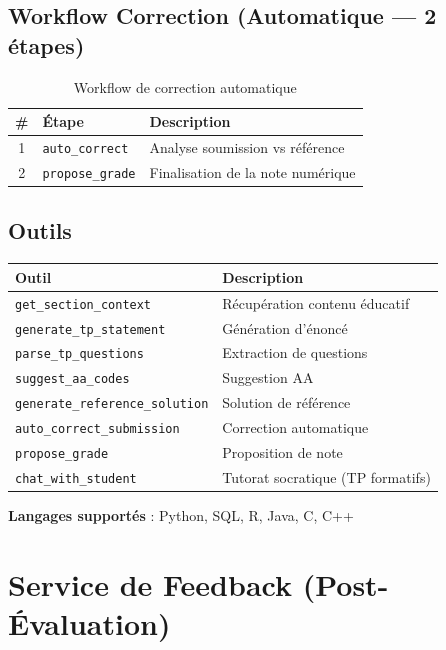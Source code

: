 \documentclass[12pt,a4paper]{article}
\begin{document}
\subsection{Workflow Correction (Automatique --- 2 étapes)}

\begin{table}[h!]
\centering
\begin{tabular}{@{}clp{8cm}@{}}
\toprule
\textbf{\#} & \textbf{Étape} & \textbf{Description} \\
\midrule
1 & \texttt{auto\_correct} & Analyse soumission vs référence \\
2 & \texttt{propose\_grade} & Finalisation de la note numérique \\
\bottomrule
\end{tabular}
\caption{Workflow de correction automatique}
\end{table}

\subsection{Outils}

\begin{longtable}{@{}p{5cm}p{9cm}@{}}
\toprule
\textbf{Outil} & \textbf{Description} \\
\midrule
\endhead
\texttt{get\_section\_context} & Récupération contenu éducatif \\
\texttt{generate\_tp\_statement} & Génération d'énoncé \\
\texttt{parse\_tp\_questions} & Extraction de questions \\
\texttt{suggest\_aa\_codes} & Suggestion AA \\
\texttt{generate\_reference\_solution} & Solution de référence \\
\texttt{auto\_correct\_submission} & Correction automatique \\
\texttt{propose\_grade} & Proposition de note \\
\texttt{chat\_with\_student} & Tutorat socratique (TP formatifs) \\
\bottomrule
\end{longtable}

\textbf{Langages supportés} : Python, SQL, R, Java, C, C++

\section{Service de Feedback (Post-Évaluation)}
\end{document}
